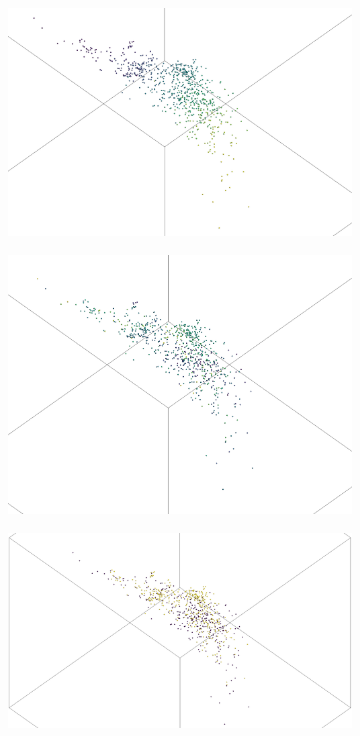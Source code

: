  	\begin{figure}[h]
 		\centering
 		\begin{subfigure}[c]{0.45\textwidth}			
 			\includegraphics[width=1\textwidth]{bilder/FazitUndAusblick/Grapple_TTAE_Res/TT_Emb_y.png}
 		\end{subfigure}
 		\begin{subfigure}[c]{0.45\textwidth}			
 			\includegraphics[width=1\textwidth]{bilder/FazitUndAusblick/Grapple_TTAE_Res/TT_Emb_x.png}
 		\end{subfigure}
 		\begin{subfigure}[c]{0.6\textwidth}			
 			\includegraphics[width=1\textwidth]{bilder/FazitUndAusblick/Grapple_TTAE_Res/TT_Emb_pred.png}

\end{subfigure}
\end{figure}
